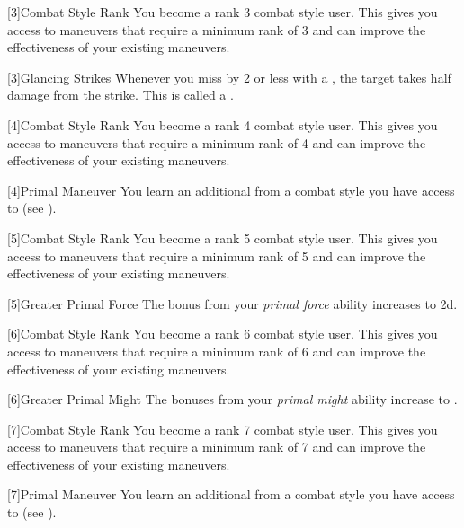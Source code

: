        {
            [3]{Combat Style Rank} You become a rank 3 combat style user.
            This gives you access to maneuvers that require a minimum rank of 3 and can improve the effectiveness of your existing maneuvers.

            [3]{Glancing Strikes} Whenever you miss by 2 or less with a , the target takes half damage from the strike.
            This is called a .
        }

        {
            [4]{Combat Style Rank} You become a rank 4 combat style user.
            This gives you access to maneuvers that require a minimum rank of 4 and can improve the effectiveness of your existing maneuvers.

            [4]{Primal Maneuver}
            You learn an additional  from a combat style you have access to (see ).
        }

        {
            [5]{Combat Style Rank} You become a rank 5 combat style user.
            This gives you access to maneuvers that require a minimum rank of 5 and can improve the effectiveness of your existing maneuvers.

            [5]{Greater Primal Force} The bonus from your \textit{primal force} ability increases to \plus2d.
        }

        {
            [6]{Combat Style Rank} You become a rank 6 combat style user.
            This gives you access to maneuvers that require a minimum rank of 6 and can improve the effectiveness of your existing maneuvers.

            [6]{Greater Primal Might} The bonuses from your \textit{primal might} ability increase to .
        }

        {
            [7]{Combat Style Rank} You become a rank 7 combat style user.
            This gives you access to maneuvers that require a minimum rank of 7 and can improve the effectiveness of your existing maneuvers.

            [7]{Primal Maneuver}
            You learn an additional  from a combat style you have access to (see ).

        }

